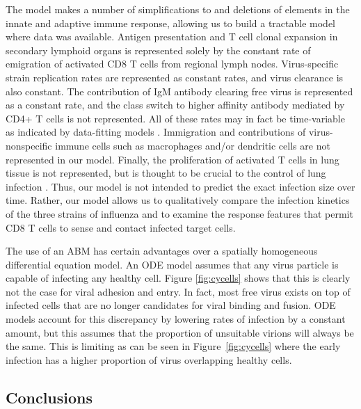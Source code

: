 \documentclass[10pt]{article}
\begin{document}
The model makes a number of simplifications to and deletions of elements in the innate and adaptive immune response, allowing us to build a tractable model where data was available.  Antigen presentation and T cell clonal expansion in secondary lymphoid organs is represented solely by the constant rate of emigration of activated CD8 T cells from regional lymph nodes.  Virus-specific strain replication rates are represented as constant rates, and virus clearance is also constant.  The contribution of IgM antibody clearing free virus is represented as a constant rate, and the class switch to higher affinity antibody mediated by CD4+ T cells is not represented.  All of these rates may in fact be time-variable as indicated by data-fitting models \cite{Wu2011}.  Immigration and contributions of virus-nonspecific immune cells such as macrophages and/or dendritic cells are not represented in our model.  Finally, the proliferation of activated T cells in lung tissue is not represented, but is thought to be crucial to the control of lung infection \cite{Miao2010}.  Thus, our model is not intended to predict the exact infection size over time.  Rather, our model allows us to qualitatively compare the infection kinetics of the three strains of influenza and to examine the response features that permit CD8 T cells to sense and contact infected target cells.

The use of an ABM has certain advantages over a spatially homogeneous differential equation model.  An ODE model assumes that any virus particle is capable of infecting any healthy cell.  Figure \ref{fig:cycells} shows that this is clearly not the case for viral adhesion and entry.  In fact, most free virus exists on top of infected cells that are no longer candidates for viral binding and fusion.  ODE models account for this discrepancy by lowering rates of infection by a constant amount, but this assumes that the proportion of unsuitable virions will always be the same.  This is limiting as can be seen in Figure~\ref{fig:cycells} where the early infection has a higher proportion of virus overlapping healthy cells.

\subsection*{Conclusions}
\end{document}
